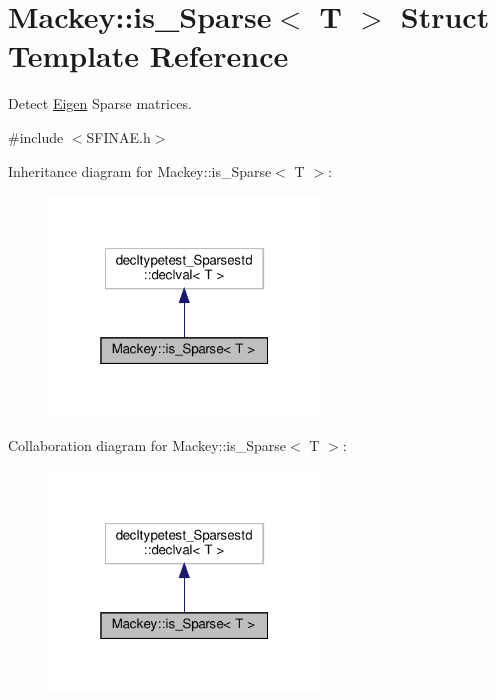 \hypertarget{structMackey_1_1is__Sparse}{}\section{Mackey\+:\+:is\+\_\+\+Sparse$<$ T $>$ Struct Template Reference}
\label{structMackey_1_1is__Sparse}


Detect \hyperlink{namespaceEigen}{Eigen} Sparse matrices.  




{\ttfamily \#include $<$S\+F\+I\+N\+A\+E.\+h$>$}



Inheritance diagram for Mackey\+:\+:is\+\_\+\+Sparse$<$ T $>$\+:\nopagebreak
\begin{figure}[H]
\begin{center}
\leavevmode
\includegraphics[width=205pt]{structMackey_1_1is__Sparse__inherit__graph}
\end{center}
\end{figure}


Collaboration diagram for Mackey\+:\+:is\+\_\+\+Sparse$<$ T $>$\+:\nopagebreak
\begin{figure}[H]
\begin{center}
\leavevmode
\includegraphics[width=205pt]{structMackey_1_1is__Sparse__coll__graph}
\end{center}
\end{figure}


